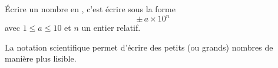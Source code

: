 Écrire un nombre en , c'est écrire sous la forme
$$\pm\,a\times10^n$$
avec $1\leq a\leq10$ et $n$ un entier relatif.\par\noindent La notation scientifique
permet d'écrire des petits (ou grands) nombres de manière plus lisible.